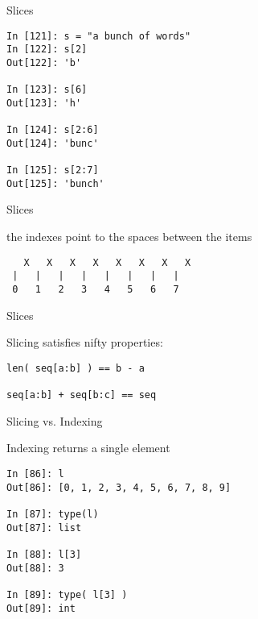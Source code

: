 \documentclass{beamer}
\begin{document}
\begin{frame}[fragile]{Slices}
\begin{verbatim}
In [121]: s = "a bunch of words"
In [122]: s[2]
Out[122]: 'b'

In [123]: s[6]
Out[123]: 'h'

In [124]: s[2:6]
Out[124]: 'bunc'

In [125]: s[2:7]
Out[125]: 'bunch'
\end{verbatim}

\end{frame}


\begin{frame}[fragile]{Slices}

{\Large the indexes point to the spaces between the items}

\vfill
\begin{verbatim}
   X   X   X   X   X   X   X   X
 |   |   |   |   |   |   |   | 
 0   1   2   3   4   5   6   7
\end{verbatim}

\end{frame}

\begin{frame}[fragile]{Slices}

{\Large Slicing satisfies nifty properties:

\vfill
\begin{verbatim}
len( seq[a:b] ) == b - a

seq[a:b] + seq[b:c] == seq

\end{verbatim}

}

\end{frame}

\begin{frame}[fragile]{Slicing vs. Indexing}

{\Large Indexing returns a single element}

\begin{verbatim}
In [86]: l
Out[86]: [0, 1, 2, 3, 4, 5, 6, 7, 8, 9]

In [87]: type(l)
Out[87]: list

In [88]: l[3]
Out[88]: 3

In [89]: type( l[3] )
Out[89]: int
\end{verbatim}
\end{frame}
\end{document}
